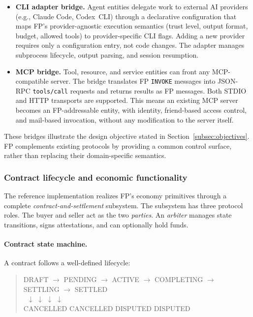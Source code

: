 \begin{itemize}
    \item \textbf{CLI adapter bridge.}  Agent entities delegate work to
      external AI providers (e.g., Claude Code, Codex~CLI) through a
      declarative configuration that maps FP's provider-agnostic
      execution semantics (trust level, output format, budget, allowed
      tools) to provider-specific CLI flags.  Adding a new provider
      requires only a configuration entry, not code changes.  The adapter
      manages subprocess lifecycle, output parsing, and session
      resumption.

    \item \textbf{MCP bridge.}  Tool, resource, and service entities can
      front any MCP-compatible server.  The bridge translates FP
      \texttt{INVOKE} messages into JSON-RPC \texttt{tools/call} requests
      and returns results as FP messages.  Both STDIO and HTTP transports
      are supported.  This means an existing MCP server becomes an
      FP-addressable entity, with identity, friend-based access control,
      and mail-based invocation, without any modification to the server
      itself.
\end{itemize}

\noindent These bridges illustrate the design objective stated in
Section~\ref{subsec:objectives}. FP complements existing protocols by
providing a common control surface, rather than replacing their
domain-specific semantics.

\subsubsection{Contract lifecycle and economic functionality}

The reference implementation realizes FP's economy primitives through a complete \emph{contract-and-settlement} subsystem. The subsystem has three protocol roles. The buyer and seller act as the two \emph{parties}. An \emph{arbiter} manages state transitions, signs attestations, and can optionally hold funds.

\paragraph{Contract state machine.}
A contract follows a well-defined lifecycle:

\begin{quote}
\small\ttfamily
DRAFT $\rightarrow$ PENDING $\rightarrow$ ACTIVE $\rightarrow$ COMPLETING $\rightarrow$ SETTLING $\rightarrow$ SETTLED \\
\quad\, $\downarrow$ \hspace{4.2em} $\downarrow$ \hspace{3.8em} $\downarrow$ \hspace{5.6em} $\downarrow$ \\
\quad CANCELLED \hspace{1em} CANCELLED \hspace{0.8em} DISPUTED \hspace{2em} DISPUTED
\end{quote}


